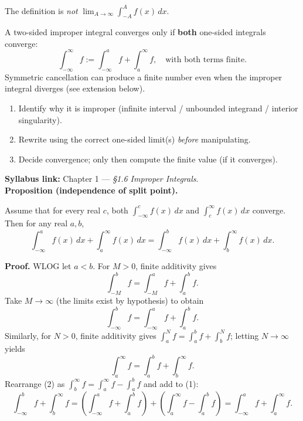 \begin{commonmistake}[title={Common Mistake: Treating $\int_{-\infty}^{\infty}$ as a symmetric single limit}]
The definition is \emph{not} $\lim_{A\to\infty}\int_{-A}^{A} f(x)\,dx$.

A two-sided improper integral converges only if \textbf{both} one-sided integrals converge:
\[
\int_{-\infty}^{\infty} f := \int_{-\infty}^{a} f + \int_a^{\infty} f,
\quad \text{with both terms finite.}
\]
Symmetric cancellation can produce a finite number even when the improper integral diverges (see extension below).
\end{commonmistake}

\begin{examtip}[title={Exam Focus: Improper integrals (non-negotiable workflow)}]
\begin{enumerate}[label=(\arabic*), leftmargin=*]
\item Identify why it is improper (infinite interval / unbounded integrand / interior singularity).
\item Rewrite using the correct one-sided limit(s) \emph{before} manipulating.
\item Decide convergence; only then compute the finite value (if it converges).
\end{enumerate}
\end{examtip}

\begin{extension}[title={Extension (Tutorial 3, Question 2, Method 1)}]
\textbf{Syllabus link:} Chapter 1 — \emph{§1.6 Improper Integrals}.\\
\textbf{Proposition (independence of split point).}

Assume that for every real $c$, both $\int_{-\infty}^{c} f(x)\,dx$ and $\int_{c}^{\infty} f(x)\,dx$ converge.
Then for any real $a,b$,
\[
\int_{-\infty}^{a} f(x)\,dx+\int_{a}^{\infty} f(x)\,dx
=
\int_{-\infty}^{b} f(x)\,dx+\int_{b}^{\infty} f(x)\,dx.
\]

\textbf{Proof.} WLOG let $a<b$. For $M>0$, finite additivity gives
\[
\int_{-M}^{b} f=\int_{-M}^{a} f+\int_{a}^{b} f.
\]
Take $M\to\infty$ (the limits exist by hypothesis) to obtain
\[
\int_{-\infty}^{b} f=\int_{-\infty}^{a} f+\int_{a}^{b} f. \tag{1}
\]
Similarly, for $N>0$, finite additivity gives $\int_{a}^{N} f=\int_{a}^{b} f+\int_{b}^{N} f$; letting $N\to\infty$ yields
\[
\int_{a}^{\infty} f=\int_{a}^{b} f+\int_{b}^{\infty} f. \tag{2}
\]
Rearrange (2) as $\int_{b}^{\infty} f=\int_{a}^{\infty} f-\int_{a}^{b} f$ and add to (1):
\[
\int_{-\infty}^{b} f+\int_{b}^{\infty} f
=\left(\int_{-\infty}^{a} f+\int_{a}^{b} f\right)+\left(\int_{a}^{\infty} f-\int_{a}^{b} f\right)
=\int_{-\infty}^{a} f+\int_{a}^{\infty} f.
\]
\end{extension}

